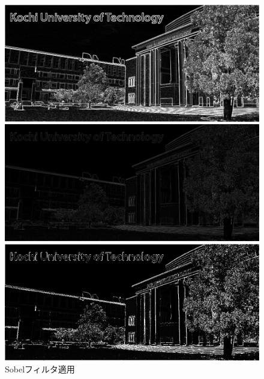 \begin{figure}[H]
\begin{minipage}[b]{.3\textwidth}
    \end{minipage}
    \begin{minipage}[b]{.3\textwidth}
        \centering
        \includegraphics[keepaspectratio,width=\textwidth]{../../Figures/06_33_diff-img.png}
    \end{minipage}
    \caption{Sobelフィルタ適用}
    \begin{minipage}[b]{.3\textwidth}
        \centering
        \includegraphics[keepaspectratio,width=\textwidth]{../../Figures/06_41_lf-img}
    \end{minipage}
    \begin{minipage}[b]{.3\textwidth}
        \centering
        \includegraphics[keepaspectratio,width=\textwidth]{../../Figures/06_43_lf-img-thresholding.png}

\end{minipage}
\end{figure}
